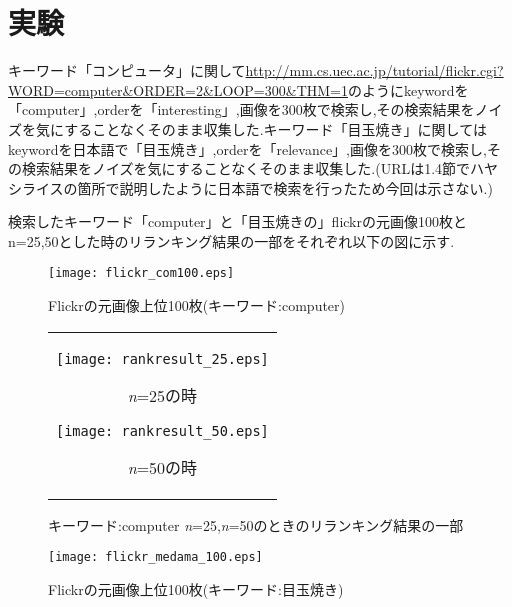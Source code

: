 \documentclass[11pt,a4j]{jreport}
\begin{document}
\section{実験}

キーワード「コンピュータ」に関して\url{http://mm.cs.uec.ac.jp/tutorial/flickr.cgi?WORD=computer&ORDER=2&LOOP=300&THM=1}のようにkeywordを「computer」,orderを「interesting」,画像を300枚で検索し,その検索結果をノイズを気にすることなくそのまま収集した.キーワード「目玉焼き」に関してはkeywordを日本語で「目玉焼き」,orderを「relevance」,画像を300枚で検索し,その検索結果をノイズを気にすることなくそのまま収集した.(URLは1.4節でハヤシライスの箇所で説明したように日本語で検索を行ったため今回は示さない.)

検索したキーワード「computer」と「目玉焼きの」flickrの元画像100枚とn=25,50とした時のリランキング結果の一部をそれぞれ以下の図に示す.
\newpage
\begin{figure}[htbp]
  \begin{center}
          \texttt{[image: flickr\_com100.eps]}
        \caption{Flickrの元画像上位100枚(キーワード:computer)}
  \end{center}
\end{figure}
  

\begin{figure}[htbp]
  \begin{center}
    \begin{tabular}{c}
      \begin{minipage}{0.5\hsize}
        \begin{center}
          \texttt{[image: rankresult\_25.eps]}
        \end{center}
        \hspace{3cm} \textit{n}=25の時
      \end{minipage}
      \begin{minipage}{0.5\hsize}
        \begin{center}
          \texttt{[image: rankresult\_50.eps]}
        \end{center}
        \hspace{3cm}\textit{n}=50の時
      \end{minipage}
    \end{tabular}
    \caption{キーワード:computer \textit{n}=25,\textit{n}=50のときのリランキング結果の一部}
  \end{center}
\end{figure}

\newpage
\begin{figure}[htbp]
    \begin{center}
      \texttt{[image: flickr\_medama\_100.eps]}
      \caption{Flickrの元画像上位100枚(キーワード:目玉焼き)}
    \end{center}
  \end{figure}
\end{document}
